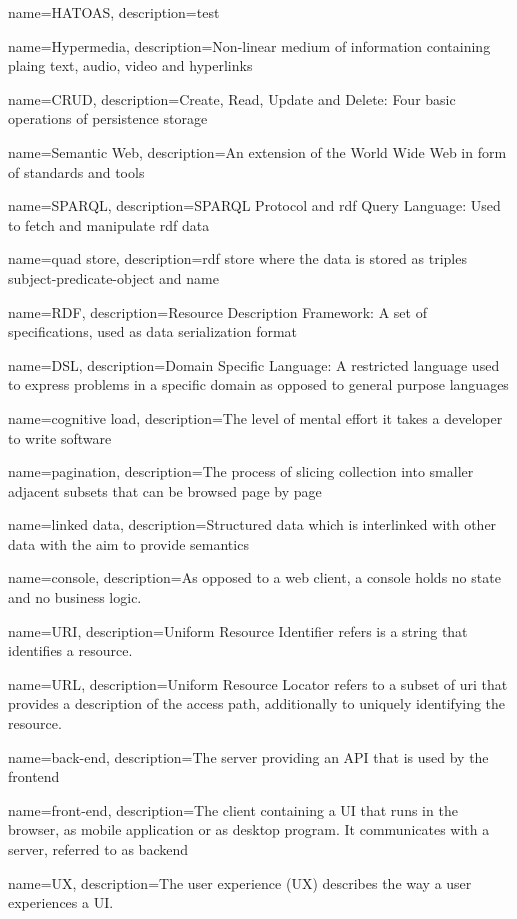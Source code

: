 {
    name={HATOAS},
    description={test}
}

{
    name={Hypermedia},
    description={Non-linear medium of information containing plaing text, audio, video and hyperlinks}
}

{
    name={CRUD},
    description={Create, Read, Update and Delete: Four basic operations of persistence storage}
}

{
    name={Semantic Web},
    description={An extension of the World Wide Web in form of standards and tools}
}

{
    name={SPARQL},
    description={SPARQL Protocol and \gls{rdf} Query Language: Used to fetch and manipulate \gls{rdf} data}
}

{
    name={quad store},
    description={\gls{rdf} store where the data is stored as triples subject-predicate-object and name}
}

{
    name={RDF},
    description={Resource Description Framework: A set of specifications, used as data serialization format}
}

{
    name={DSL},
    description={Domain Specific Language: A restricted language used to express problems in a specific domain as opposed to general purpose languages}
}

{
    name={cognitive load},
    description={The level of mental effort it takes a developer to write software}
}

{
    name={pagination},
    description={The process of slicing collection into smaller adjacent subsets that can be browsed page by page}
}

{
    name={linked data},
    description={Structured data which is interlinked with other data with the aim to provide semantics}
}

{
    name={console},
    description={As opposed to a web client, a console holds no state and no business logic.}
}

{
    name={URI},
    description={Uniform Resource Identifier refers is a string that identifies a resource.}
}

{
    name={URL},
    description={Uniform Resource Locator refers to a subset of \gls{uri} that provides a description of the access path, additionally to uniquely identifying the resource.}
}

{
    name={back-end},
    description={The server providing an API that is used by the \gls{frontend}}
}

{
    name={front-end},
    description={The client containing a UI that runs in the browser, as mobile application or as desktop program. It communicates with a server, referred to as \gls{backend}}
}

{
    name={UX},
    description={The user experience (UX) describes the way a user experiences a UI.}
}
